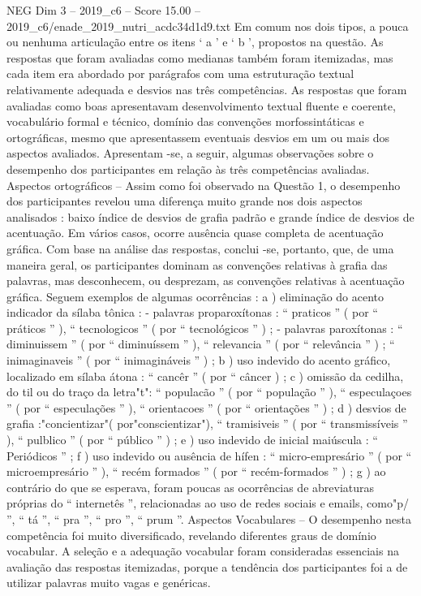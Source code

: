 \begin{textsample}{NEG Dim 3 – 2019\_c6 – Score 15.00 – 2019\_c6/enade\_2019\_nutri\_acdc34d1d9.txt}
Em comum nos dois tipos, a pouca ou nenhuma articulação entre os itens ‘ a ’ e ‘ b ’, propostos na questão.
As respostas que foram avaliadas como medianas também foram itemizadas, mas cada item era abordado por parágrafos com uma estruturação textual relativamente adequada e desvios nas três competências.
As respostas que foram avaliadas como boas apresentavam desenvolvimento textual fluente e coerente, vocabulário formal e técnico, domínio das convenções morfossintáticas e ortográficas, mesmo que apresentassem eventuais desvios em um ou mais dos aspectos avaliados.
Apresentam -se, a seguir, algumas observações sobre o desempenho dos participantes em relação às três competências avaliadas.
Aspectos ortográficos – Assim como foi observado na Questão 1, o desempenho dos participantes revelou uma diferença muito grande nos dois aspectos analisados : baixo índice de desvios de grafia padrão e grande índice de desvios de acentuação.
Em vários casos, ocorre ausência quase completa de acentuação gráfica.
Com base na análise das respostas, conclui -se, portanto, que, de uma maneira geral, os participantes dominam as convenções relativas à grafia das palavras, mas desconhecem, ou desprezam, as convenções relativas à acentuação gráfica.
Seguem exemplos de algumas ocorrências : a ) eliminação do acento indicador da sílaba tônica : - palavras proparoxítonas : “ praticos ” ( por “ práticos ” ), “ tecnologicos ” ( por “ tecnológicos ” ) ; - palavras paroxítonas : “ diminuissem ” ( por “ diminuíssem ” ), “ relevancia ” ( por “ relevância ” ) ; “ inimaginaveis ” ( por “ inimagináveis ” ) ; b ) uso indevido do acento gráfico, localizado em sílaba átona : “ cancêr ” ( por “ câncer ) ; c ) omissão da cedilha, do til ou do traço da letra"t": “ populacão ” ( por “ população ” ), “ especulaçoes ” ( por “ especulações ” ), “ orientacoes ” ( por “ orientações ” ) ; d ) desvios de grafia :"concientizar"( por"conscientizar"), “ tramisiveis ” ( por “ transmissíveis ” ), “ pulblico ” ( por “ público ” ) ; e ) uso indevido de inicial maiúscula : “ Periódicos ” ; f ) uso indevido ou ausência de hífen : “ micro-empresário ” ( por “ microempresário ” ), “ recém formados ” ( por “ recém-formados ” ) ; g ) ao contrário do que se esperava, foram poucas as ocorrências de abreviaturas próprias do “ internetês ”, relacionadas ao uso de redes sociais e emails, como"p/ ”, “ tá ”, “ pra ”, “ pro ”, “ prum ”.
Aspectos Vocabulares – O desempenho nesta competência foi muito diversificado, revelando diferentes graus de domínio vocabular.
A seleção e a adequação vocabular foram consideradas essenciais na avaliação das respostas itemizadas, porque a tendência dos participantes foi a de utilizar palavras muito vagas e genéricas.

\end{textsample}
